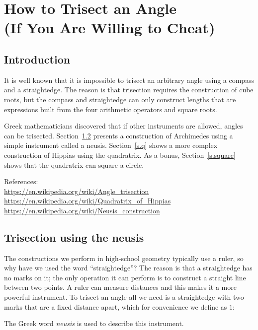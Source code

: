 
\chapter[How to Trisect an Angle (If You Are Willing to Cheat)]{How to Trisect an Angle\\\bigskip (If You Are Willing to Cheat)}\label{c.trisect}


\section{Introduction}

It is well known that it is impossible to trisect an arbitrary angle using a compass and a straightedge. The reason is that trisection requires the construction of cube roots, but the compass and straightedge can only construct lengths that are expressions built from the four arithmetic operators and square roots.

Greek mathematicians discovered that if other instruments are allowed, angles can be trisected. Section~\ref{s.neusis} presents a construction of Archimedes using a simple instrument called a neusis. Section~\ref{s.q} shows a more complex construction of Hippias using the quadratrix. As a bonus, Section~\ref{s.square} shows that the quadratrix can square a circle.

References:\\
\url{https://en.wikipedia.org/wiki/Angle_trisection}\\
\url{https://en.wikipedia.org/wiki/Quadratrix_of_Hippias}\\
\url{https://en.wikipedia.org/wiki/Neusis_construction}

\newpage


\section{Trisection using the neusis}\label{s.neusis}

The constructions we perform in high-school geometry typically use a ruler, so why have we used the word ``straightedge''? The reason is that a straightedge has no marks on it; the only operation it can perform is to construct a straight line between two points. A ruler can measure distances and this makes it a more powerful instrument. To trisect an angle all we need is a straightedge with two marks that are a fixed distance apart, which for convenience we define as $1$:
\begin{center}
\end{center}
The Greek word \emph{neusis} is used to describe this instrument.

